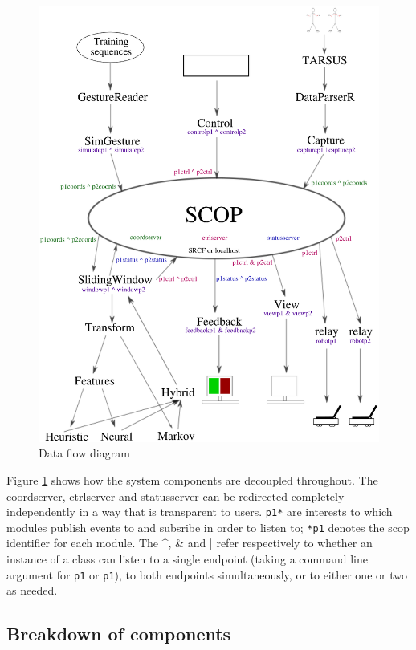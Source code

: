 \documentclass[12pt,a4,notitlepage]{report}
\renewcommand{\_}{\texttt{\symbol{95}}}
\newcommand{\<}{\texttt{\symbol{60}}}
\renewcommand{\>}{\texttt{\symbol{62}}}
\newcommand{\scopendpoint}[1]{\texttt{#1}}
\newcommand{\variable}[1]{\texttt{#1}}
\begin{document}
\begin{figure}
\centering
\includegraphics[scale=0.75,angle=0]{diagrams/dataflowdiagram.ps}
\caption{Data flow diagram}
\label{dfd}
\end{figure}

Figure \ref{dfd} shows how the system components are decoupled throughout. The coordserver, ctrlserver and statusserver can be redirected completely independently in a way that is transparent to users. \scopendpoint{p1*} are interests to which modules publish events to and subsribe in order to listen to; \variable{*p1} denotes the scop identifier for each module. The ^, & and | refer respectively to whether an instance of a class can listen to a single endpoint (taking a command line argument for \scopendpoint{p1} or \scopendpoint{p1}), to both endpoints simultaneously, or to either one or two as needed.

\subsection{Breakdown of components}
\end{document}
